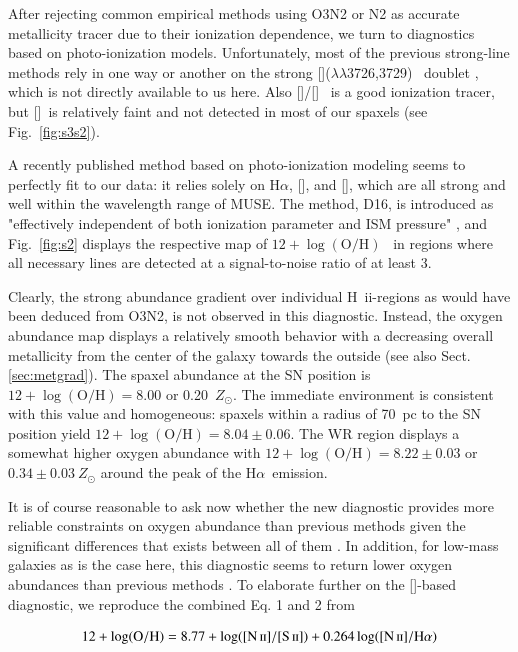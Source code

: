 \documentclass[traditabstract, referee]{aa}
\newcommand{\ha}{H$\alpha$}
\newcommand{\hii}{\mbox{H~{\sc ii}}}
\newcommand{\oh}{12+\log(\mathrm{O/H})}
\newcommand{\sii}{[\ion{S}{ii}]}
\newcommand{\siii}{[\ion{S}{iii}]}
\newcommand{\oii}{[\ion{O}{ii}]}
\newcommand{\nii}{[\ion{N}{ii}]}
\begin{document}
After rejecting common empirical methods using O3N2 or N2 as accurate metallicity tracer due to their ionization dependence, we turn to diagnostics based on photo-ionization models. Unfortunately, most of the previous strong-line methods rely in one way or another on the strong \oii($\lambda\lambda$3726,3729)~ doublet \citep{2002ApJS..142...35K}, which is not directly available to us here. Also \siii/\sii~ is a good ionization tracer, but \siii~is relatively faint and not detected in most of our spaxels (see Fig.~\ref{fig:s3s2}). 

A recently published method based on photo-ionization modeling \citep{2016Ap&SS.361...61D} seems to perfectly fit to our data: it relies solely on \ha, \nii, and \sii, which are all strong and well within the wavelength range of MUSE. The method, D16, is introduced as "effectively independent of both ionization parameter and ISM pressure" \citep{2016Ap&SS.361...61D}, and Fig.~\ref{fig:s2} displays the respective map of $\oh$~ in regions where all necessary lines are detected at a signal-to-noise ratio of at least 3.

Clearly, the strong abundance gradient over individual \hii-regions as would have been deduced from O3N2, is not observed in this diagnostic. Instead, the oxygen abundance map displays a relatively smooth behavior with a decreasing overall metallicity from the center of the galaxy towards the outside (see also Sect. \ref{sec:metgrad}). The spaxel abundance at the SN position is $\oh=8.00$ or 0.20~$Z_{\odot}$. The immediate environment is consistent with this value and homogeneous: spaxels within a radius of 70~pc to the SN position yield $\oh = 8.04\pm 0.06$. The WR region displays a somewhat higher oxygen abundance with $\oh=8.22\pm 0.03$ or $0.34\pm0.03~Z_{\odot}$ around the peak of the \ha~emission.

It is of course reasonable to ask now whether the new \citet{2016Ap&SS.361...61D} diagnostic provides more reliable constraints on oxygen abundance than previous methods given the significant differences that exists between all of them \citep{2016arXiv161108595B}. In addition, for low-mass galaxies as is the case here, this diagnostic seems to return lower oxygen abundances than previous methods \citep{2016ApJ...823L..24K}. To elaborate further on the \sii-based diagnostic, we reproduce the combined Eq. 1 and 2 from \citet{2016Ap&SS.361...61D}

\begin{equation}
\label{eq:s2}
12+\log(\mathrm{O/H}) = 8.77 + \log([\ion{N}{ii}]/[\ion{S}{ii}]) + 0.264\log([\ion{N}{ii}]/\mathrm{H}\alpha)
\end{equation}
\end{document}
